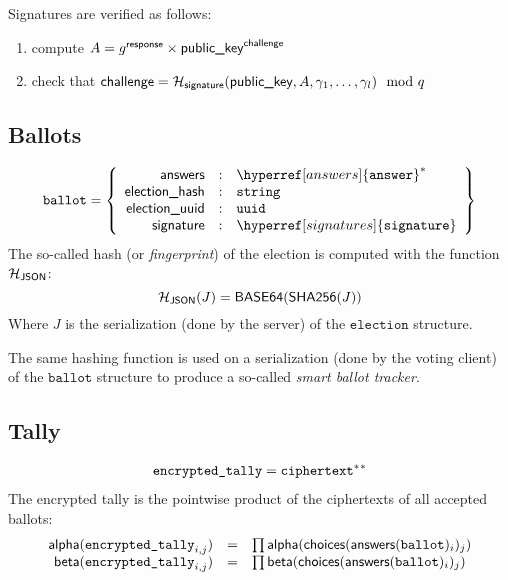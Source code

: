 \documentclass[a4paper]{article}
\newcommand{\basesixfour}{\textsf{BASE64}}
\newcommand{\shatwo}{\textsf{SHA256}}
\newcommand{\jstring}{\texttt{string}}
\newcommand{\uuid}{\texttt{uuid}}
\newcommand{\election}{\texttt{election}}
\newcommand{\ballot}{\texttt{ballot}}
\newcommand{\etally}{\texttt{encrypted\_tally}}
\begin{document}
Signatures are verified as follows:
\begin{enumerate}
\item compute $A=g^{\textsf{response}}\times \textsf{public\_key}^{\textsf{challenge}}$
\item check that $\textsf{challenge}=\mathcal{H}_{\textsf{signature}}(\textsf{public\_key},A,\gamma_1,\dots,\gamma_l)\mod q$
\end{enumerate}

\subsection{Ballots}
\label{ballots}

\newcommand{\json}{\textsf{JSON}}

\begin{gather*}
  \ballot=\left\{
    \begin{array}{rcl}
      \answers&:&\hyperref[answers]{\answer}^\ast\\
      \textsf{election\_hash}&:&\jstring\\
      \textsf{election\_uuid}&:&\uuid\\
      \siglabel&:&\hyperref[signatures]{\signature}
    \end{array}
  \right\}
\end{gather*}
The so-called hash (or \emph{fingerprint}) of the election
is computed with the function $\Hash_\json$:
\[
\Hash_\json(J)=\basesixfour(\shatwo(J))
\]
Where $J$ is the serialization (done by the server) of the $\election$
structure.

The same hashing function is used on a serialization (done by the
voting client) of the $\ballot$ structure to produce a so-called
\emph{smart ballot tracker}.

\subsection{Tally}
\label{tally}

\begin{gather*}
  \etally=\ciphertext^\ast{}^\ast
\end{gather*}
The encrypted tally is the pointwise product of the ciphertexts of all
accepted ballots:
\[
\begin{array}{rcl}
\alphalabel(\etally_{i,j})&=&\prod\alphalabel(\choices(\answers(\ballot)_i)_j)\\
\betalabel(\etally_{i,j})&=&\prod\betalabel(\choices(\answers(\ballot)_i)_j)
\end{array}
\]

\newcommand{\dfactors}{\textsf{decryption\_factors}}
\newcommand{\dproofs}{\textsf{decryption\_proofs}}
\newcommand{\decrypt}{\textsf{decrypt}}
\end{document}
